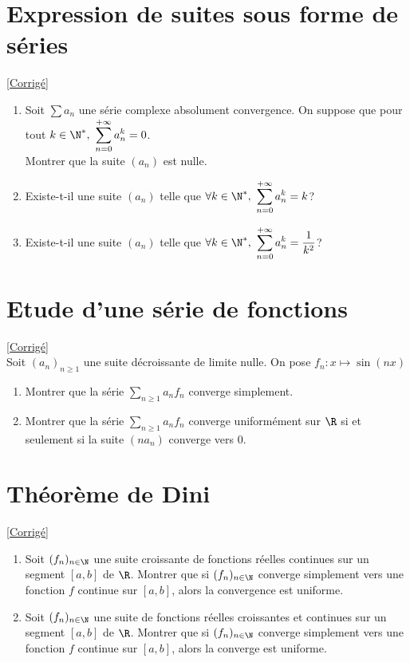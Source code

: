 \documentclass{book}
\begin{document}
	\section{Expression de suites sous forme de séries}
	\textcolor{blue}{\hyperref[sec:expression-de-suites-sous-forme-de-series]{[Corrigé]}}\\
	\label{Expression de suites sous forme de séries}
	\begin{enumerate}[leftmargin=*]
		\item Soit $\displaystyle\sum a_n$ une série complexe absolument convergence. On suppose que pour tout $k\in\N^*, \ \displaystyle\sum\limits_{n=0}^{+\infty}a_n^k=0$.\\
		Montrer que la suite $(a_n)$ est nulle.
		\item Existe-t-il une suite $(a_n)$ telle que $\forall k\in\N^*, \ \displaystyle\sum\limits_{n=0}^{+\infty}a_n^k=k$?
		\item Existe-t-il une suite $(a_n)$ telle que $\forall k\in\N^*, \ \displaystyle\sum\limits_{n=0}^{+\infty}a_n^k=\frac{1}{k^2}$?
	\end{enumerate}
	
	\section{Etude d'une série de fonctions}
	\textcolor{blue}{\hyperref[sec:etude-dune-serie-de-fonctions]{[Corrigé]}}\\
	\label{Etude d'une série de fonctions}
	Soit $(a_n)_{n\geq1}$ une suite décroissante de limite nulle. On pose $f_n:x\mapsto\sin(nx)$
	\begin{enumerate}[leftmargin=*, noitemsep]
		\item Montrer que la série $\displaystyle\sum\limits_{n\geq1}a_nf_n$ converge simplement.
		\item Montrer que la série $\displaystyle\sum\limits_{n\geq1}a_nf_n$ converge uniformément sur $\R$ si et seulement si la suite $(na_n)$ converge vers $0$.
	\end{enumerate}
	
	\section{Théorème de Dini }
	\textcolor{blue}{\hyperref[Théorème de Dini corrigé]{[Corrigé]}}\\
	\label{Théorème de Dini}
	\begin{enumerate}[leftmargin=*]
		\item Soit $(f_n)_{n\in \N}$ une suite croissante de fonctions réelles continues sur un segment $[a,b]$ de $\R$. Montrer que si $(f_n)_{n\in \N}$ converge simplement vers une fonction $f$ continue sur $[a,b]$, alors la convergence est uniforme.
		\item Soit $(f_n)_{n\in \N}$ une suite de fonctions réelles croissantes et continues sur un segment $[a,b]$ de $\R$. Montrer que si $(f_n)_{n\in \N}$ converge simplement vers une fonction $f$ continue sur $[a,b]$, alors la converge est uniforme.
	\end{enumerate}
	
\end{document}
